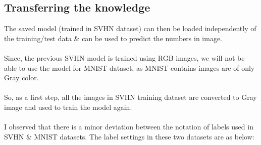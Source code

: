 \documentclass{article}
\begin{document}
    \newpage
	\subsection{Transferring the knowledge}
	
	The saved model (trained in SVHN dataset) can then be loaded independently of
	the training/test data \& can be used to predict the numbers in image.\\\\
	Since, the previous SVHN model is trained using RGB images, we will not be able
	to use the model for MNIST dataset, as MNIST contains images are of only Gray color.
	\\\\So, as a first step, all the images in SVHN training dataset are converted
	to Gray image and used to train the model again.\\\\I observed that there is a
	minor deviation between the notation of labels used in SVHN \& MNIST datasets.
	The label settings in these two datasets are as below:
	
\end{document}
